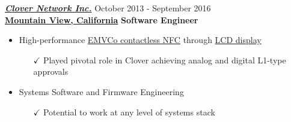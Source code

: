 \vspace{8pt}
{\sl \href{http://www.clover.com}{\textbf{Clover Network Inc.}}} \hfill        October 2013 - September 2016 \\
\href{http://www.clover.com/team}{\textbf{Mountain View, California}}       \hfill   \textbf{Software Engineer}
   \begin{itemize} \itemsep -2pt %
   \item High-performance \href{http://www.emvco.com/}{EMVCo contactless NFC} through \href{https://www.clover.com/pos-hardware/mobile}{LCD display}
   \begin{itemize}
   \item[$\checkmark$]
   Played pivotal role in Clover achieving analog and digital L1-type approvals
   \iftoggle{detailedVersion}{\item[$\checkmark$] NFC (reader) through display required fighing Physics - we were the world's first to overcome challenge
   \begin{itemize}\item[\tiny$\blacksquare$] Led cross-functional team (Hardware, Systems-software, RF-experts) realize what seemed like mission impossible
   \item[\tiny$\blacksquare$] Demonstrated ability to jump into unknown domains, work with cross-functional experts, and rapidly deliver on a hard project
   \end{itemize}}{}
   \end{itemize}

   \item Systems Software and Firmware Engineering
   \begin{itemize}
   \item[$\checkmark$] Potential to work at any level of systems stack
   \iftoggle{detailedVersion}{\item[$\checkmark$] Developed portions of secure payments software
   \begin{itemize}\item[\tiny$\blacksquare$] Developed Linux kernel drivers for custom hardware interfaces
   \item[\tiny$\blacksquare$] Worked on Android OS framework, Android recovery etc.
   \item[\tiny$\blacksquare$] Code written mostly in C, Java, C++ and scripting languages such as Python and bash
   \end{itemize}}{}
   \end{itemize}


\end{itemize}
